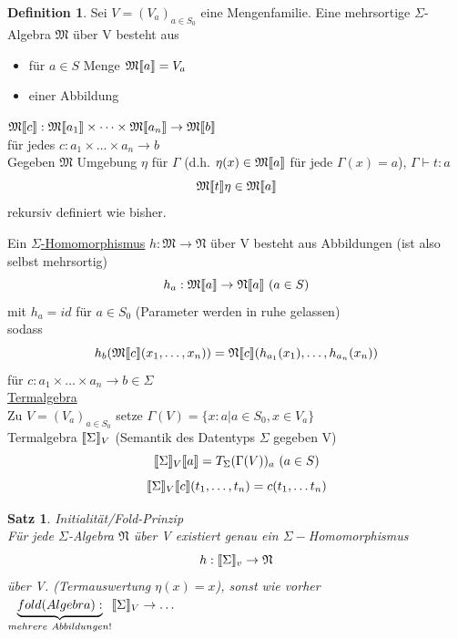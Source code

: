 \documentclass{article}
\newtheorem{satz}{Satz}
\theoremstyle{definition}
\newtheorem{definition}{Definition}[section]
\begin{document}
	\begin{definition} Sei $V=(V_a)_{a\in S_0}$ eine Mengenfamilie. Eine mehrsortige $\Sigma$-Algebra $\mathfrak{M}$ über V besteht aus\\
	\begin{itemize}
		\item für $a\in S$ Menge $\mathfrak{M}\llbracket a\rrbracket=V_a$
		\item einer Abbildung
	\end{itemize}
	$\mathfrak{M}\llbracket c\rrbracket:\mathfrak{M}\llbracket a_1\rrbracket\times\dots\times \mathfrak{M}\llbracket a_n\rrbracket\to \mathfrak{M}\llbracket b\rrbracket$\\
	für jedes $c:a_1\times\dots\times a_n\to b$\\
	Gegeben $\mathfrak{M}$ Umgebung $\eta$ für $\Gamma$ (d.h. $\eta(x)\in\mathfrak{M}\llbracket a\rrbracket$ für jede $\Gamma(x)=a$), $\Gamma\vdash t:a$
	\[\mathfrak{M}\llbracket t\rrbracket\eta\in\mathfrak{M}\llbracket a\rrbracket\]
	rekursiv definiert wie bisher.\\
	\end{definition}
	Ein \underline{$\Sigma$-Homomorphismus}	$h:\mathfrak{M}\to \mathfrak{N}$ über V besteht aus Abbildungen (ist also selbst mehrsortig)
	 \[h_a:\mathfrak{M}\dbrack{a}\to\mathfrak{N}\dbrack{a}\ (a\in S)\]
	mit $h_a=id$ für $a\in S_0$ (Parameter werden in ruhe gelassen)\\
	sodass
	\[h_b(\mathfrak{M}\llbracket c\rrbracket(x_1,\dots,x_n)) = \mathfrak{N}\llbracket c\rrbracket(h_{a_1}(x_1),\dots,h_{a_n}(x_n))\]
	für $c:a_1\times \dots\times a_n\to b\in\Sigma$\\
	\underline{Termalgebra}\\
	Zu $V=(V_a)_{a\in S_0}$ setze $\Gamma(V)=\{x:a|a\in S_0,x\in V_a\}$\\
	Termalgebra $\llbracket \Sigma\rrbracket_V$ (Semantik des Datentyps $\Sigma$ gegeben V)
	\[\llbracket \Sigma\rrbracket_V\llbracket a\rrbracket = T_\Sigma(\Gamma(V))_a\  (a\in S)\]
	\[\llbracket \Sigma\rrbracket_V\llbracket c\rrbracket(t_1,\dots, t_n) = c(t_1,\dots t_n)\]
	\begin{satz} Initialität/Fold-Prinzip\\
	Für jede $\Sigma$-Algebra $\mathfrak{N}$ über V existiert genau ein $\Sigma-$Homomorphismus
	\[h:\llbracket \Sigma\rrbracket_v\to \mathfrak{N}\]
	über V. (Termauswertung $\eta(x)=x$), sonst wie vorher\\
	$\underbrace{fold (Algebra):}_{mehrere\ Abbildungen!} \dbrack{\Sigma}_V\to\dots$
	\end{satz}
\end{document}
